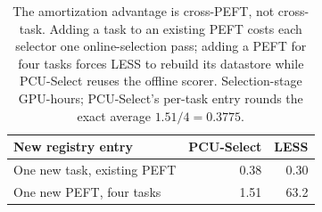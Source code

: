 \begin{table}[t]
\centering
\small
\setlength{\tabcolsep}{6pt}
\begin{tabular}{lrr}
\toprule
New registry entry & PCU-Select & LESS \\
\midrule
One new task, existing PEFT   & 0.38 & 0.30 \\
One new PEFT, four tasks       & 1.51 & 63.2 \\
\bottomrule
\end{tabular}
\caption{The amortization advantage is cross-PEFT, not cross-task. Adding a task
to an existing PEFT costs each selector one online-selection pass; adding a PEFT for
four tasks forces LESS to rebuild its datastore while PCU-Select reuses the
offline scorer. Selection-stage GPU-hours; PCU-Select's per-task entry rounds
the exact average $1.51/4=0.3775$.}
\label{tab:cost-axes}
\end{table}
